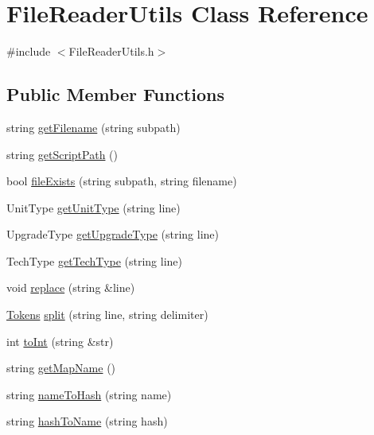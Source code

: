 \hypertarget{class_file_reader_utils}{\section{File\-Reader\-Utils Class Reference}
\label{class_file_reader_utils}
}


{\ttfamily \#include $<$File\-Reader\-Utils.\-h$>$}

\subsection*{Public Member Functions}
\begin{DoxyCompactItemize}
\item 
string \hyperlink{class_file_reader_utils_ac97c05c74d38a30718053a8487c35ae5}{get\-Filename} (string subpath)
\item 
string \hyperlink{class_file_reader_utils_a14fcca343121a7bee04674ae292b1e2c}{get\-Script\-Path} ()
\item 
bool \hyperlink{class_file_reader_utils_a39a019e35e82cd2ba6693f9de53f823e}{file\-Exists} (string subpath, string filename)
\item 
Unit\-Type \hyperlink{class_file_reader_utils_a3610e4425373e34077c8aa6a0cebc0d2}{get\-Unit\-Type} (string line)
\item 
Upgrade\-Type \hyperlink{class_file_reader_utils_a1fc2d2cc1710e13a2b789c629a014e35}{get\-Upgrade\-Type} (string line)
\item 
Tech\-Type \hyperlink{class_file_reader_utils_a1826e7fa51b8c8af1857924a900647a2}{get\-Tech\-Type} (string line)
\item 
void \hyperlink{class_file_reader_utils_ab7caf12d9315c0fede08ebecccdde74e}{replace} (string \&line)
\item 
\hyperlink{struct_tokens}{Tokens} \hyperlink{class_file_reader_utils_ab7228c9717c2f278b440b61db712974d}{split} (string line, string delimiter)
\item 
int \hyperlink{class_file_reader_utils_a681030da28963b166b13e5bdd601807c}{to\-Int} (string \&str)
\item 
string \hyperlink{class_file_reader_utils_a91e2dc2098d36acde7ea5d1bfc157ac1}{get\-Map\-Name} ()
\item 
string \hyperlink{class_file_reader_utils_a447d938ec051d5934fcf0729f1a02003}{name\-To\-Hash} (string name)
\item 
string \hyperlink{class_file_reader_utils_aa2cd7e46cc9775270dc51196b87e3c08}{hash\-To\-Name} (string hash)
\end{DoxyCompactItemize}


